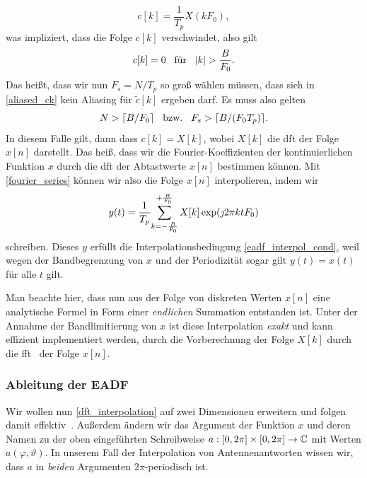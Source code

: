 \begin{equation}
    c[k] = \frac{1}{T_p} X(k F_0),
\end{equation}
was impliziert, dass die Folge $c[k]$ verschwindet, also gilt
\begin{equation}
    c[k] = 0 {\hspace{3mm} \text{f\"ur} \hspace{3mm}} {\left| k \right|} > \frac{B}{F_0}.
\end{equation}
Das hei{\ss}t, dass wir nun $F_s = N/T_p$ so gro{\ss} w\"ahlen m\"ussen, dass sich in \eqref{aliased_ck} kein Aliasing f\"ur $\tilde{c}[k]$ ergeben darf. Es muss also gelten
\begin{equation}
    N > \lceil B/F_0 \rceil {\hspace{3mm} \text{bzw.} \hspace{3mm}} F_s > \lceil B/(F_0 T_p) \rceil.
\end{equation}
In diesem Falle gilt, dann dass $c[k] = X[k]$, wobei $X[k]$ die \gls{dft} der Folge $x[n]$ darstellt. Das hei{\ss}, dass wir die Fourier-Koeffizienten der kontinuierlichen Funktion $x$ durch die \gls{dft} der Abtastwerte $x[n]$ bestimmen k\"onnen. Mit \eqref{fourier_series} k\"onnen wir also die Folge $x[n]$ interpolieren, indem wir
\begin{equation}\label{dft_interpolation}
    y(t) = \frac{1}{T_p}{\sum\limits_{k=-\frac{B}{F_0}}^{+\frac{B}{F_0}}{
        X[k] \exp(\jmath 2 \pi k t F_0) 
    }}
\end{equation}
schreiben. Dieses $y$ erf\"ullt die Interpolationsbedingung \eqref{eadf_interpol_cond}, weil wegen der Bandbegrenzung von $x$ und der Periodizit\"at sogar gilt $y(t) = x(t)$ f\"ur alle $t$ gilt.

Man beachte hier, dass nun aus der Folge von diskreten Werten $x[n]$ eine analytische Formel in Form einer \emph{endlichen} Summation entstanden ist. Unter der Annahme der Bandlimitierung von $x$ ist diese Interpolation \emph{exakt} und kann effizient implementiert werden, durch die Vorberechnung der Folge $X[k]$ durch die \gls{fft}~\cite{FFTW05} der Folge $x[n]$. 
%
%
%
%
\subsubsection{Ableitung der EADF}
%
%
Wir wollen nun \eqref{dft_interpolation} auf zwei Dimensionen erweitern und folgen damit effektiv~\cite{landmann2004EADF}.
Au{\ss}erdem \"andern wir das Argument der Funktion $x$ und deren Namen zu der oben eingef\"uhrten Schreibweise $a : [0, 2 \pi] \times [0, 2 \pi] \rightarrow \mathbb{C}$ mit Werten $a(\varphi, \vartheta)$. 
In unserem Fall der Interpolation von Antennenantworten wissen wir, dass $a$ in \emph{beiden} Argumenten $2\pi$-periodisch ist.

